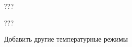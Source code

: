 
\begin{DoxyRefList}
\item[Class \mbox{\hyperlink{class_color_changer}{Color\+Changer}} ]\label{todo__todo000001}%
%
??? 
\item[Class \mbox{\hyperlink{class_distributor}{Distributor}} ]\label{todo__todo000002}%
%
??? 
\item[Class \mbox{\hyperlink{class_universal_converter}{Universal\+Converter}} ]\label{todo__todo000003}%
%
Добавить другие температурные режимы
\end{DoxyRefList}